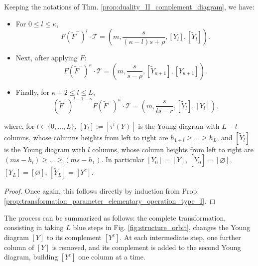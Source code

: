 \documentclass[11pt,a4paper]{amsart}
\numberwithin{equation}{section}
\begin{document}
\begin{lemma}
\label{thm:intermediate_duality_type_I}
Keeping the notations of Thm. \ref{prop:duality_II_complement_diagram}, we have:
\begin{itemize}
\item For $0\leq l\leq \kappa$,
\[
F (\widetilde{F}^-)^{l} \cdot\mathcal T=\left(m, \frac{s}{(\kappa-l)s+\rho}, [Y_l],[\widetilde Y_l]\right).
\] 
\item Next, after applying $F$:
\[
F (\widetilde{F}^-)^{\kappa} \cdot\mathcal T=\left(m, \frac{s}{s-\rho}, [\widetilde Y_{\kappa+1}], [Y_{\kappa+1}]\right).
\] 
\item Finally, for $\kappa+2\leq l\leq L$,
\[
(\widetilde{F}^+)^{l-1-\kappa} F (\widetilde{F}^-)^{\kappa} \cdot\mathcal T=\left(m, \frac{s}{ls-r}, [\widetilde Y_l], [Y_l]\right).
\] 
\end{itemize}
where, for $l\in \{0, \dots, L\}$, $[Y_l]:=[\tau^l(Y)]$ is the Young diagram with $L-l$ columns, whose columns heights from left to right are $h_{1+l}\geq \dots \geq h_L$, and $[\widetilde Y_l]$ is the Young diagram with $l$ columns, whose column heights from left to right are $(ms-h_{l})\geq \dots \geq (ms-h_{1})$. In particular $[Y_0]=[Y]$, $[\widetilde Y_0]=[\varnothing]$, $[Y_L]=[\varnothing]$, $[\widetilde Y_L]=[Y^c]$. 
\end{lemma}


\begin{proof}
Once again, this follows directly by induction from Prop. \ref{prop:transformation_parameter_elementary_operation_type_I}.
\end{proof}

The process can be summarized as follows: the complete transformation, consisting in taking $L$ blue steps in Fig. \ref{fig:structure_orbit}, changes the Young diagram $[Y]$ to its complement $[Y^c]$. At each intermediate step, one further column of $[Y]$ is removed, and its complement is added to the second Young diagram, building $[Y^c]$ one column at a time. 
\end{document}
